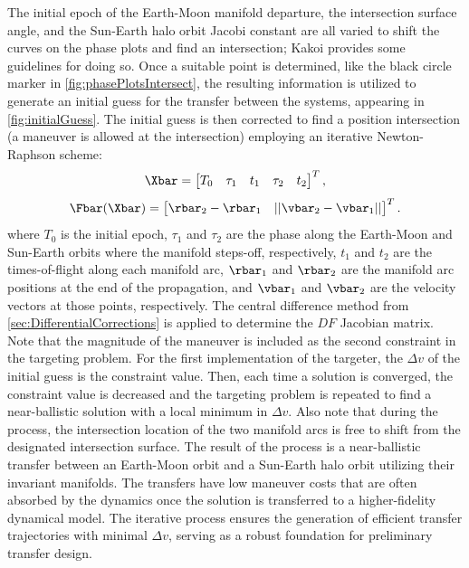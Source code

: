 The initial epoch of the Earth-Moon manifold departure, the intersection surface angle, and the
Sun-Earth halo orbit Jacobi constant are all varied to shift the curves on the phase plots and find
an intersection; Kakoi provides some guidelines for doing so\cite{Kakoi:2015}. Once a suitable
point is determined, like the black circle marker in \cref{fig:phasePlotsIntersect}, the resulting
information is utilized to generate an initial guess for the transfer between the systems,
appearing in \cref{fig:initialGuess}. The initial guess is then corrected to find a position
intersection (a maneuver is allowed at the intersection) employing an iterative Newton-Raphson
scheme:
\begin{equation}
    \Xbar=\begin{bmatrix}   T_{0}   &   \tau_{1}    &   t_{1}   &   \tau_{2}    &   t_{2}   \end{bmatrix}^{T},
    \label{eq:nbfreevar}
\end{equation}
\vspace{1mm}
\begin{equation}
    \Fbar(\Xbar)=\begin{bmatrix}    \rbar_{2}-\rbar_{1} &   ||\vbar_{2}-\vbar_{1}|| \end{bmatrix}^{T}.
    \label{eq:nbconst}
\end{equation}
where $T_{0}$ is the initial epoch, $\tau_{1}$ and $\tau_{2}$ are the phase along the Earth-Moon
and Sun-Earth orbits where the manifold steps-off, respectively, $t_{1}$ and $t_{2}$ are the
times-of-flight along each manifold arc, $\rbar_{1}$ and $\rbar_{2}$ are the manifold arc positions
at the end of the propagation, and $\vbar_{1}$ and $\vbar_{2}$ are the velocity vectors at those
points, respectively. The central difference method from \cref{sec:DifferentialCorrections} is
applied to determine the $DF$ Jacobian matrix. Note that the magnitude of the maneuver is included
as the second constraint in the targeting problem. For the first implementation of the targeter,
the $\Delta v$ of the initial guess is the constraint value. Then, each time a solution is
converged, the constraint value is decreased and the targeting problem is repeated to find a
near-ballistic solution with a local minimum in $\Delta v$. Also note that during the process, the
intersection location of the two manifold arcs is free to shift from the designated intersection
surface. The result of the process is a near-ballistic transfer between an Earth-Moon orbit and a
Sun-Earth halo orbit utilizing their invariant manifolds. The transfers have low maneuver costs
that are often absorbed by the dynamics once the solution is transferred to a higher-fidelity
dynamical model. The iterative process ensures the generation of efficient transfer trajectories
with minimal $\Delta v$, serving as a robust foundation for preliminary transfer design.

